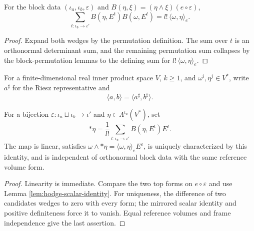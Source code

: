 \begin{lemma}
\label{lem:hodge-scalar-identity}
\leanok
{}
For the block data $(\iota_a,\iota_b,\varepsilon)$ and $B(\eta,\xi)=(\eta\wedge\xi)(e\circ\varepsilon)$,
\[
\sum_{t:\iota_b\to\iota'}B(\eta,E^t)B(\omega,E^t)=l!\,\langle\omega,\eta\rangle_e.
\]
\end{lemma}
\begin{proof}
\leanok
\sketch Expand both wedges by the permutation definition. The sum over $t$ is an orthonormal determinant sum, and the remaining permutation sum collapses by the block-permutation lemmas to the defining sum for $l!\,\langle\omega,\eta\rangle_e$.
\end{proof}

For a finite-dimensional real inner product space $V$, $k\ge1$, and $\omega^i,\eta^j\in V^*$, write $a^\sharp$ for the Riesz representative and
\begin{equation}
\langle a,b\rangle=\langle a^\sharp,b^\sharp\rangle. \tag{2.26a}
\end{equation}

\begin{proposition}
\label{prop:hodge-star-pointwise}
\leanok
{}
For a bijection $\varepsilon:\iota_a\sqcup\iota_b\to\iota'$ and $\eta\in\Lambda^{\iota_a}(V^*)$, set
\[
{*}\eta=\frac1{l!}\sum_{t:\iota_b\to\iota'}B(\eta,E^t)E^t.
\]
The map is linear, satisfies $\omega\wedge {*}\eta=\langle\omega,\eta\rangle_eE^\varepsilon$, is uniquely characterized by this identity, and is independent of orthonormal block data with the same reference volume form.
\end{proposition}
\begin{proof}
\leanok
\sketch Linearity is immediate. Compare the two top forms on $e\circ\varepsilon$ and use Lemma \ref{lem:hodge-scalar-identity}. For uniqueness, the difference of two candidates wedges to zero with every form; the mirrored scalar identity and positive definiteness force it to vanish. Equal reference volumes and frame independence give the last assertion.
\end{proof}

